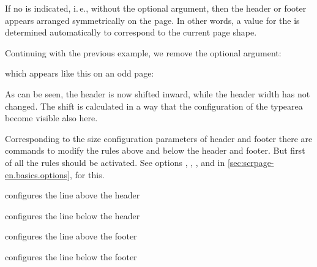 If no  is indicated, i.\,e., without the optional argument,
then the header or footer appears arranged symmetrically on the page.
In other words, a value for the  is determined
automatically to correspond to the current page shape.
%
\begin{Example}
  Continuing with the previous example, we remove the optional
  argument:
\begin{lstcode}
\end{lstcode}
%
  which appears like this on an odd page:
%
  \begin{XmpTopPage}
    \thinlines{}
  \end{XmpTopPage}
\end{Example}

As can be seen, the header is now shifted inward, while the header
width has not changed. The shift is calculated in a way that the
configuration of the typearea become visible also here.%
%
\EndIndexGroup


\begin{Declaration}
\end{Declaration}%
Corresponding to the size configuration parameters of header and
footer there are commands to modify the rules above and below the
header and footer. But first of all the rules should be activated. See options  
, ,
, and  in
\autoref{sec:scrpage-en.basics.options},
 for this.

\begin{labeling}[\,--]{}
\item[\Macro{setheadtopline}] configures the line above the header
\item[\Macro{setheadsepline}] configures the line below the header
\item[\Macro{setfootsepline}] configures the line above the footer
\item[\Macro{setfootbotline}] configures the line below the footer
\end{labeling}


